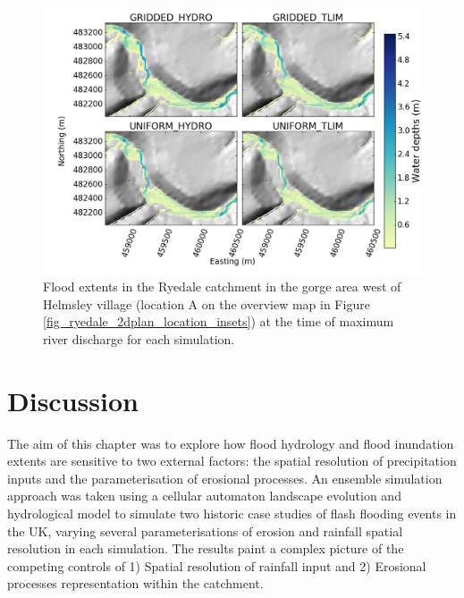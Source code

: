 \begin{figure}
\includegraphics[width=20cm]{chp_flood_figs_scripts/fig_ryedale_flood_ensemble_upstream.png}
\caption{Flood extents in the Ryedale catchment in the gorge area west of Helmsley village (location A on the overview map in Figure \ref{fig_ryedale_2dplan_location_insets}) at the time of maximum river discharge for each simulation.}
\label{fig_ryedale_2dplan_flood_ensemble_upstream}
\end{figure}

\section{Discussion}

The aim of this chapter was to explore how flood hydrology and flood inundation extents are sensitive to two external factors: the spatial resolution of precipitation inputs and the parameterisation of erosional processes. An ensemble simulation approach was taken using a cellular automaton landscape evolution and hydrological model to simulate two historic case studies of flash flooding events in the UK, varying several parameterisations of erosion and rainfall spatial resolution in each simulation. The results paint a complex picture of the competing controls of 1) Spatial resolution of rainfall input and 2) Erosional processes representation within the catchment.

